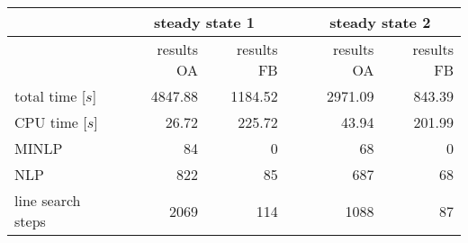 \begin{minipage}{\linewidth}
    \center
    \footnotesize
    \begin{tabular}{lrrcrr}
        & \multicolumn{2}{c}{steady state 1} & & \multicolumn{2}{c}{steady state 2} \\ \hline
        \rowcolor{white} & results OA & results FB & & results OA & results FB \\ \hline
        total time [$s$] & 4847.88 & 1184.52 & & 2971.09 & 843.39 \\
        CPU time [$s$] & 26.72 & 225.72 & & 43.94 & 201.99 \\
        MINLP & 84 & 0 & & 68 & 0 \\
        NLP & 822 & 85 & & 687 & 68 \\
        line search steps & 2069 & 114 & & 1088 & 87 \\ \hline
    \end{tabular}
\end{minipage}

